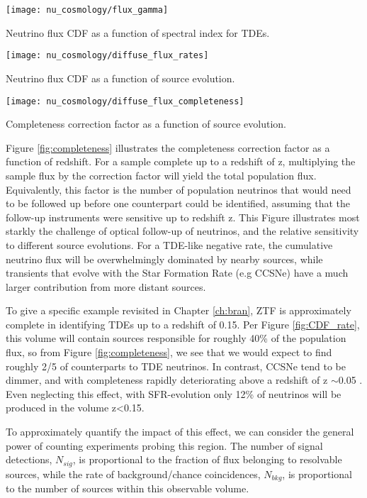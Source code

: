 \begin{marginfigure}
	\centering \texttt{[image: nu\_cosmology/flux\_gamma]}
	\caption{Neutrino flux CDF as a function of spectral index for TDEs.}
	\label{fig:CDF_gamma}
\end{marginfigure}


\begin{marginfigure}
	\centering \texttt{[image: nu\_cosmology/diffuse\_flux\_rates]}
	\caption{Neutrino flux CDF as a function of source evolution.}
	\label{fig:CDF_rate}
\end{marginfigure}

\begin{marginfigure}
	\centering \texttt{[image: nu\_cosmology/diffuse\_flux\_completeness]}
	\caption{Completeness correction factor as a function of source evolution.}
	\label{fig:completeness}
\end{marginfigure}

Figure \ref{fig:completeness} illustrates the completeness correction factor as a function of redshift. For a sample complete up to a redshift of z, multiplying the sample flux by the correction factor will yield the total population flux. Equivalently,  this factor is the number of population neutrinos that would need to be followed up before one counterpart could be identified, assuming that the follow-up instruments were sensitive up to redshift z. This Figure illustrates most starkly the challenge of optical follow-up of neutrinos, and the relative sensitivity to different source evolutions. For a TDE-like negative rate, the cumulative neutrino flux  will be overwhelmingly dominated by nearby sources, while transients that evolve with the Star Formation Rate (e.g CCSNe) have a much larger contribution from more distant sources.

To give a specific example revisited in Chapter \ref{ch:bran}, ZTF is approximately complete in identifying TDEs up to a redshift of 0.15. Per Figure \ref{fig:CDF_rate}, this volume will contain sources responsible for roughly 40\% of the population flux, so from Figure \ref{fig:completeness}, we see that we would expect to find roughly 2/5 of counterparts to TDE neutrinos. In contrast, CCSNe tend to be dimmer, and with completeness rapidly deteriorating above a redshift of z $\sim$0.05 . Even neglecting this effect, with SFR-evolution only 12\% of neutrinos will be produced in the volume z<0.15.

To approximately quantify the impact of this effect, we can consider the general power of counting experiments probing this region. The number of signal detections, $N_{sig}$, is proportional to the fraction of flux belonging to resolvable sources, while the rate of background/chance coincidences, $N_{bkg}$, is proportional to the number of sources within this observable volume.

